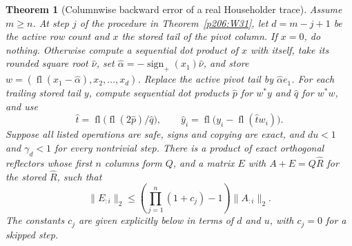 \documentclass[11pt,oneside,openany]{book}
\theoremstyle{plain}
\newtheorem{theorem}{Theorem}[chapter]
\theoremstyle{definition}
\theoremstyle{remark}
\begin{document}
\begin{theorem}[Columnwise backward error of a real Householder trace]
\label{p206:W32}
Assume \(m\ge n\). At step \(j\) of the procedure in
Theorem~\ref{p206:W31}, let \(d=m-j+1\) be the active row count
and \(x\) the stored tail of the pivot column. If \(x=0\), do
nothing. Otherwise compute a sequential dot product of \(x\) with
itself, take its rounded square root \(\hat\nu\), set
\(\hat\alpha=-\operatorname{sign}_+(x_1)\hat\nu\), and store
\(w=(\operatorname{fl}(x_1-\hat\alpha),x_2,\ldots,x_d)\).
Replace the active pivot tail by \(\hat\alpha e_1\).
For each trailing stored tail \(y\), compute sequential dot
products \(\hat p\) for \(w^*y\) and \(\hat q\) for \(w^*w\), and use
\[
 \hat t=\operatorname{fl}\bigl(\operatorname{fl}(2\hat p)/\hat q\bigr),
 \qquad
 \hat y_i=\operatorname{fl}\bigl(y_i-\operatorname{fl}(\hat t w_i)\bigr).
\]
Suppose all listed operations are safe, signs and copying are exact,
and \(du<1\) and \(\gamma_d<1\) for every nontrivial step.
There is a product of exact orthogonal reflectors whose first \(n\)
columns form \(Q\), and a matrix \(E\) with \(A+E=Q\hat R\)
for the stored \(\hat R\), such that
\[
       \|E_{:i}\|_2
           \le \left(\prod_{j=1}^{n}(1+c_j)-1\right)\|A_{:i}\|_2 .
\]
The constants \(c_j\) are given explicitly below in terms of
\(d\) and \(u\), with \(c_j=0\) for a skipped step.
\end{theorem}
\end{document}
